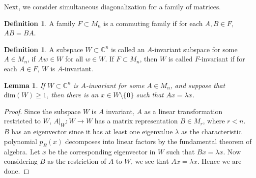 \documentclass[12pt]{article}
\newtheorem{lemma}[thm]{Lemma}
\theoremstyle{definition}
\newtheorem{defn}[thm]{Definition}
\theoremstyle{remark}
\begin{document}
Next, we consider simultaneous diagonalization for a family of matrices.
\begin{defn}
  A family $F \subset M_n$ is a commuting family if for each $A, B
  \in F$, $AB = BA$.
\end{defn}

\begin{defn}
  A subspace $W \subset \mathbb{C}^n$ is called an $A$-invariant
  subspace for some $A \in M_n$, if $Aw \in W$ for all $w \in W$. If
  $F \subset M_n$, then $W$ is called $F$-invariant if for each $A
  \in F$, $W$ is $A$-invariant.
\end{defn}

\begin{lemma}
  If $W \subset \mathbb{C}^n$ is $A$-invariant for some $A \in M_n$,
  and suppose that $\textrm{dim}(W) \ge 1$, then there is an $x \in W
  \setminus \{  \textbf{0} \}$ such that $Ax = \lambda x$.
\end{lemma}
\begin{proof}
  Since the subspace $W$ is $A$ invariant, $A$ as a linear
  transformation  restricted to $W$, $A|_W: W \to W$ has a matrix
  representation $B \in M_r$, where $r < n$. $B$ has an
  eigenvector since it has at least one eigenvalue $\lambda$ as the
  characteristic polynomial $p_B(x)$ decomposes into linear factors
  by the fundamental theorem of algebra. Let $x$ be the corresponding
  eigenvector in $W$ such that $Bx = \lambda x$. Now considering $B$
  as the restriction of $A$ to $W$, we see that $Ax = \lambda x$.
  Hence we are done.
\end{proof}
\end{document}
